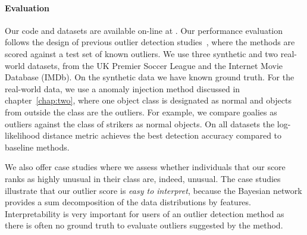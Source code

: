 \paragraph{Evaluation} Our code and datasets are available on-line at \cite{url}.
Our performance evaluation follows the design of previous outlier detection studies~\cite{Gao2010,aggarwal2013},
where the methods are scored against a test set of known outliers.  
%
We use three synthetic and two real-world datasets, from the UK Premier Soccer League and the Internet Movie Database (IMDb). On the synthetic data we have known ground truth. For the real-world data, we use a anomaly injection method discussed in chapter~\ref{chap:two}, where one object class is designated as normal and objects from outside the class are the outliers. For example, we compare goalies as outliers against the class of strikers as normal objects. 
On all datasets the log-likelihood distance metric achieves the best detection accuracy compared to baseline methods. 

We also offer case studies where we assess whether individuals that our score ranks as highly unusual in their class are, indeed, unusual. 
The case studies illustrate that our outlier score is {\em easy to interpret}, because the Bayesian network provides a sum decomposition of the data distributions by features. Interpretability is very important for users of an outlier detection method as there is often no ground truth to 
evaluate outliers suggested by the method. %

